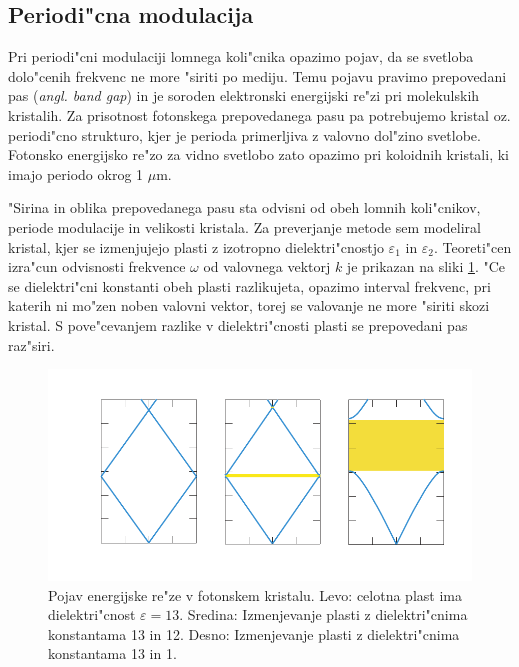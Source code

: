 \documentclass[a4paper,10pt]{article}
\newcommand{\angl}[1]{(\textit{angl. #1})}
\begin{document}
\newpage
\subsection{Periodi"cna modulacija}

Pri periodi"cni modulaciji lomnega koli"cnika opazimo pojav, da se svetloba dolo"cenih frekvenc ne more "siriti po mediju\cite{joannopoulos}. 
Temu pojavu pravimo prepovedani pas \angl{band gap} in je soroden elektronski energijski re"zi pri molekulskih kristalih. 
Za prisotnost fotonskega prepovedanega pasu pa potrebujemo kristal oz. periodi"cno strukturo, kjer je perioda primerljiva z valovno dol"zino svetlobe. 
Fotonsko energijsko re"zo za vidno svetlobo zato opazimo pri koloidnih kristali, ki imajo periodo okrog 1 $\mu$m. 


"Sirina in oblika prepovedanega pasu sta odvisni od obeh lomnih koli"cnikov, periode modulacije in velikosti kristala. 
Za preverjanje metode sem modeliral kristal, kjer se izmenjujejo plasti z izotropno dielektri"cnostjo $\varepsilon_1$ in $\varepsilon_2$. 
Teoreti"cen izra"cun odvisnosti frekvence $\omega$ od valovnega vektorj $k$ je prikazan na sliki \ref{fig:joannopoulos-crystal}. 
"Ce se dielektri"cni konstanti obeh plasti razlikujeta, opazimo interval frekvenc, pri katerih ni mo"zen noben valovni vektor, torej se valovanje ne more "siriti skozi kristal. 
S pove"cevanjem razlike v dielektri"cnosti plasti se prepovedani pas raz"siri. 

\begin{figure}[h]
\centering
 \includegraphics[width=.8\textwidth]{./Slike/bandgap}
 \caption{Pojav energijske re"ze v fotonskem kristalu. Levo: celotna plast ima dielektri"cnost $\varepsilon = 13$. Sredina: Izmenjevanje plasti z dielektri"cnima konstantama 13 in 12. Desno: Izmenjevanje plasti z dielektri"cnima konstantama 13 in 1. \cite{joannopoulos}}
 \label{fig:joannopoulos-crystal}
\end{figure}
\end{document}
